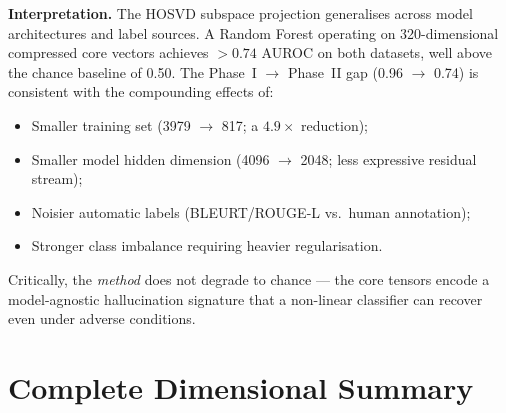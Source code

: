 \documentclass[11pt,a4paper]{article}
\begin{document}
\noindent
\textbf{Interpretation.}
The HOSVD subspace projection generalises across model architectures and
label sources.  A Random Forest operating on 320-dimensional compressed core
vectors achieves $>0.74$ AUROC on both datasets, well above the chance
baseline of 0.50.  The Phase~I $\to$ Phase~II gap (0.96 $\to$ 0.74) is
consistent with the compounding effects of:
\begin{itemize}
  \item Smaller training set (3979 $\to$ 817; a $4.9\times$ reduction);
  \item Smaller model hidden dimension (4096 $\to$ 2048; less expressive
        residual stream);
  \item Noisier automatic labels (BLEURT/ROUGE-L vs.\ human annotation);
  \item Stronger class imbalance requiring heavier regularisation.
\end{itemize}

Critically, the \emph{method} does not degrade to chance — the core tensors
encode a model-agnostic hallucination signature that a non-linear classifier
can recover even under adverse conditions.


\section{Complete Dimensional Summary}
\end{document}
